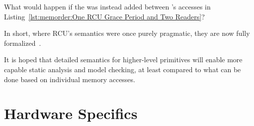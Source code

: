 \QuickQuiz{}
	What would happen if the  was instead added between
	's accesses in
	Listing~\ref{lst:memorder:One RCU Grace Period and Two Readers}?
 \QuickQuizEnd

In short, where RCU's semantics were once purely pragmatic, they are
now fully
formalized~\cite{PaulMcKenney2005RCUSemantics,MathieuDesnoyers2012URCU,AlexeyGotsman2013ESOPRCU,Alglave:2018:FSC:3173162.3177156}.




It is hoped that detailed semantics for higher-level primitives will
enable more capable static analysis and model checking, at least compared
to what can be done based on individual memory accesses.

\section{Hardware Specifics}
\label{sec:memorder:Hardware Specifics}

